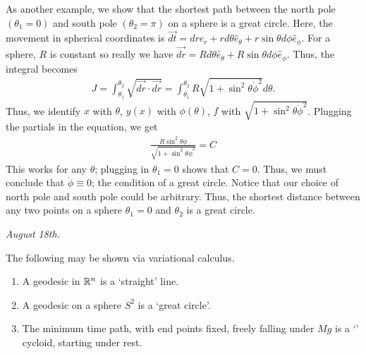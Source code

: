 \begin{example}
    As another example, we show that the shortest path between the north pole $(\theta_{1} = 0)$ and south pole $(\theta_{2} = \pi)$ on a sphere is a great circle. Here, the movement in spherical coordinates is $\vec{dt} = dr \hat{e}_{r} + rd\theta \hat{e}_{\theta} + r \sin \theta d\phi \hat{e}_{\phi}$. For a sphere, $R$ is constant so really we have $\vec{dr} = Rd \theta \hat{e}_{\theta} + R \sin \theta d\phi \hat{e}_{\phi}$. Thus, the integral becomes
    \begin{align}
        J = \int_{\theta_{1}}^{\theta_{2}} \sqrt{\vec{dr} \cdot \vec{dr}} = \int_{\theta_{1}}^{\theta_{2}} R \sqrt{1 + \sin^{2}\theta \dot{\phi}^{2}} d \theta.
    \end{align}
    Thus, we identify $x$ with $\theta$, $y(x)$ with $\phi(\theta)$, $f$ with $\sqrt{1+\sin^{2}\theta \dot{\phi}^{2}}$. Plugging the partials in the equation, we get
    \begin{align}
        \frac{R\sin^{2}\theta\dot{\phi}}{\sqrt{1+\sin^{2}\theta \dot{\phi}^{2}}} = C
    \end{align}
    This works for any $\theta$; plugging in $\theta_{1} = 0$ shows that $C = 0$. Thus, we must conclude that $\dot{\phi} \equiv 0$; the condition of a great circle. Notice that our choice of north pole and south pole could be arbitrary. Thus, the shortest distance between any two points on a sphere $\theta_{1} = 0$ and $\theta_{2}$ is a great circle.
\end{example}

\noindent \textit{August 18th.}

\begin{remark}
    The following may be shown via variational calculus.
    \begin{enumerate}
        \item A geodesic in $\mathbb{R}^{n}$ is a `straight' line.
        \item A geodesic on a sphere $S^{2}$ is a `great circle'.
        \item The minimum time path, with end points fixed, freely falling under $Mg$ is a `' cycloid, starting under rest.
    \end{enumerate}
\end{remark}


